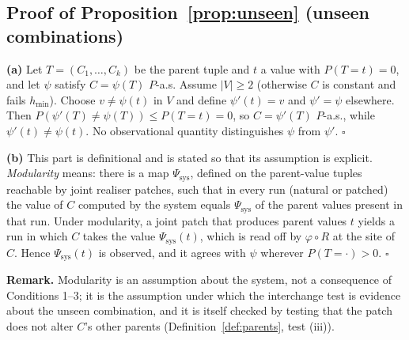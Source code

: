 \subsection{Proof of Proposition~\ref{prop:unseen} (unseen combinations)}
\label{proof:P3}
\textbf{(a)} Let $T=(C_1,\dots,C_k)$ be the parent tuple and $t$ a value with
$P(T=t)=0$, and let $\psi$ satisfy $C=\psi(T)$ $P$-a.s. Assume $|V|\ge2$
(otherwise $C$ is constant and fails $h_{\min}$). Choose $v\ne\psi(t)$ in $V$
and define $\psi'(t)=v$ and $\psi'=\psi$ elsewhere. Then
$P(\psi'(T)\ne\psi(T))\le P(T=t)=0$, so $C=\psi'(T)$ $P$-a.s., while
$\psi'(t)\ne\psi(t)$. No observational quantity distinguishes $\psi$ from
$\psi'$. \hfill$\square$

\textbf{(b)} This part is definitional and is stated so that its assumption
is explicit. \emph{Modularity} means: there is a map
$\Psi_{\mathrm{sys}}$, defined on the parent-value tuples reachable by joint
realiser patches, such that in every run (natural or patched) the value of
$C$ computed by the system equals $\Psi_{\mathrm{sys}}$ of the parent values
present in that run. Under modularity, a joint patch that produces parent
values $t$ yields a run in which $C$ takes the value $\Psi_{\mathrm{sys}}(t)$,
which is read off by $\varphi\circ R$ at the site of $C$. Hence
$\Psi_{\mathrm{sys}}(t)$ is observed, and it agrees with $\psi$ wherever
$P(T=\cdot)>0$. \hfill$\square$

\textbf{Remark.} Modularity is an assumption about the system, not a
consequence of Conditions 1--3; it is the assumption under which the
interchange test is evidence about the unseen combination, and it is itself
checked by testing that the patch does not alter $C$'s other parents
(Definition~\ref{def:parents}, test (iii)).
